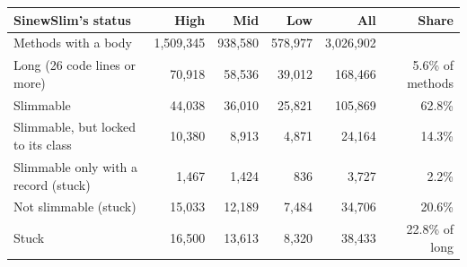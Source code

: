 \begin{tabular}{lrrrrr}
\toprule
SinewSlim's status & High & Mid & Low & All & Share \\
\midrule
Methods with a body & 1{,}509{,}345 & 938{,}580 & 578{,}977 & 3{,}026{,}902 & \\
Long (26 code lines or more) & 70{,}918 & 58{,}536 & 39{,}012 & 168{,}466 & 5.6\% of methods \\
\midrule
Slimmable & 44{,}038 & 36{,}010 & 25{,}821 & 105{,}869 & 62.8\% \\
Slimmable, but locked to its class & 10{,}380 & 8{,}913 & 4{,}871 & 24{,}164 & 14.3\% \\
Slimmable only with a record (stuck) & 1{,}467 & 1{,}424 & 836 & 3{,}727 & 2.2\% \\
Not slimmable (stuck) & 15{,}033 & 12{,}189 & 7{,}484 & 34{,}706 & 20.6\% \\
\midrule
Stuck & 16{,}500 & 13{,}613 & 8{,}320 & 38{,}433 & 22.8\% of long \\
\bottomrule
\end{tabular}

